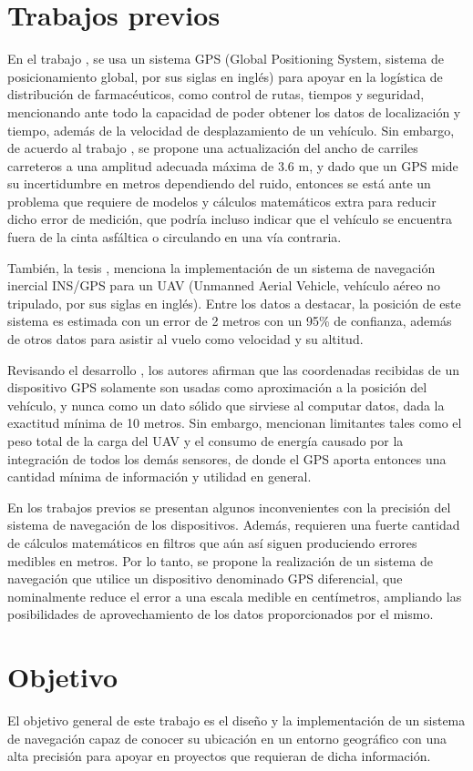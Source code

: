 \section{Trabajos previos}
En el trabajo \cite{DeLaCruz}, se usa un sistema GPS (Global Positioning System, sistema de posicionamiento global, por sus siglas en inglés) para apoyar en la logística de distribución de farmacéuticos, como control de rutas, tiempos y seguridad, mencionando ante todo la capacidad de poder obtener los datos de localización y tiempo, además de la velocidad de desplazamiento de un vehículo. Sin embargo, de acuerdo al trabajo \cite{Mendoza}, se propone una actualización del ancho de carriles carreteros a una amplitud adecuada máxima de 3.6 m, y dado que un GPS mide su incertidumbre en metros dependiendo del ruido, entonces se está ante un problema que requiere de modelos y cálculos matemáticos extra para reducir dicho error de medición, que podría incluso indicar que el vehículo se encuentra fuera de la cinta asfáltica o circulando en una vía contraria. 

También, la tesis \cite{Ron}, menciona la implementación de un sistema de navegación inercial INS/GPS para un UAV (Unmanned Aerial Vehicle, vehículo aéreo no tripulado, por sus siglas en inglés). Entre los datos a destacar, la posición de este sistema es estimada con un error de 2 metros con un 95\% de confianza, además de otros datos para asistir al vuelo como velocidad y su altitud.

Revisando el desarrollo \cite{Maldonado}, los autores afirman que las coordenadas recibidas de un dispositivo GPS solamente son usadas como aproximación a la posición del vehículo, y nunca como un dato sólido que sirviese al computar datos, dada la exactitud mínima de 10 metros. Sin embargo, mencionan limitantes tales como el peso total de la carga del UAV y el consumo de energía causado por la integración de todos los demás sensores, de donde el GPS aporta entonces una cantidad mínima de información y utilidad en general.

En los trabajos previos se presentan algunos inconvenientes con la precisión del sistema de navegación de los dispositivos. Además, requieren una fuerte cantidad de cálculos matemáticos en filtros que aún así siguen produciendo errores medibles en metros. Por lo tanto, se propone la realización de un sistema de navegación que utilice un dispositivo denominado GPS diferencial, que nominalmente reduce el error a una escala medible en centímetros, ampliando las posibilidades de aprovechamiento de los datos proporcionados por el mismo.

\section{Objetivo}
El objetivo general de este trabajo es el diseño y la implementación de un sistema de navegación capaz de conocer su ubicación en un entorno geográfico con una alta precisión para apoyar en proyectos que requieran de dicha información.
